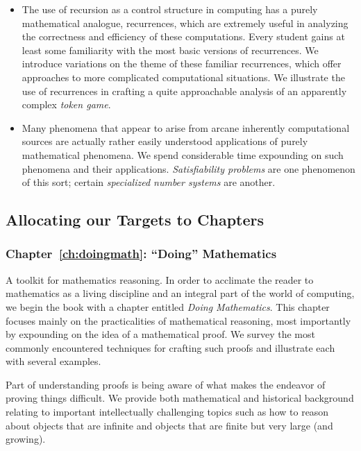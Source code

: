 \begin{enumerate}
\begin{itemize}
\item
The use of recursion as a control structure in computing has a purely
mathematical analogue, recurrences, which are extremely useful in
analyzing the correctness and efficiency of these computations.  Every
student gains at least some familiarity with the most basic versions
of recurrences.  We introduce variations on the theme of these
familiar recurrences, which offer approaches to more complicated
computational situations.  We illustrate the use of recurrences in
crafting a quite approachable analysis of an apparently complex {\em
  token game}.
\item
Many phenomena that appear to arise from arcane inherently
computational sources are actually rather easily understood
applications of purely mathematical phenomena.  We spend considerable
time expounding on such phenomena and their applications.  {\em
  Satisfiability problems} are one phenomenon of this sort; certain
{\em specialized number systems} are another.
\end{itemize}
\end{enumerate}


\subsection{Allocating our Targets to Chapters}
\label{sec:the chapters}

\subsubsection{Chapter~\ref{ch:doingmath}: ``Doing'' Mathematics}

A toolkit for mathematics reasoning.
In order to acclimate the reader to mathematics as a living discipline
and an integral part of the world of computing, we begin the book with
a chapter entitled {\it Doing Mathematics}.  This chapter focuses
mainly on the practicalities of mathematical reasoning, most
importantly by expounding on the idea of a mathematical proof.  We
survey the most commonly encountered techniques for crafting such
proofs and illustrate each with several examples.

Part of understanding proofs is being aware of what makes the endeavor
of proving things difficult.  We provide both mathematical and
historical background relating to important intellectually challenging
topics such as how to reason about objects that are infinite and
objects that are finite but very large (and growing).


